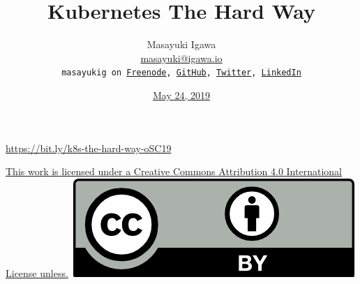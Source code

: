 \documentclass[aspectratio=169,11pt,hyperref={colorlinks=true}]{beamer}
\author[Masayuki Igawa]{%
    \texorpdfstring{%
            \centering
            Masayuki Igawa\\
            \href{mailto:masayuki@igawa.io}{masayuki@igawa.io}\\
            \texttt{masayukig on
              \href{https://freenode.net/}{Freenode},
              \href{https://github.com/masayukig}{GitHub},
              \href{https://twitter.com/masayukig}{Twitter},
              \href{https://www.linkedin.com/in/masayukig/}{LinkedIn}}
    }
    {Masayuki Igawa}
}
\date{\href{https://events.opensuse.org/conferences/oSC19}{May 24, 2019}}
\title[k8s-the-hard-way
  \hspace{4em}\insertframenumber/\inserttotalframenumber]{\Huge{Kubernetes The Hard Way}}
\begin{document}
{%
\begin{frame}[noframenumbering]
  \hypersetup{colorlinks,urlcolor=susedark}
  \titlepage{}
  \centering
  \@place \par
  \href{https://bit.ly/k8s-the-hard-way-oSC19}{https://bit.ly/k8s-the-hard-way-oSC19}
  \begin{flushright}
    \tiny\href{https://creativecommons.org/licenses/by/4.0/}{This work
      is licensed under a Creative Commons Attribution 4.0
      International License unless.}~\includegraphics[scale=0.3]{images/cc_by.png}
  \end{flushright}
\end{frame}
}
\end{document}
